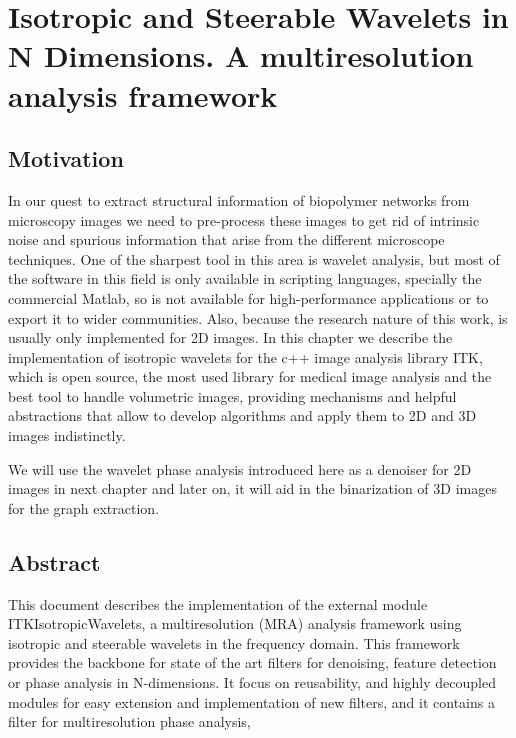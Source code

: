 
\chapter{Isotropic and Steerable Wavelets in N Dimensions. A multiresolution analysis framework}

\label{Chapter-Wavelets} %


\section{Motivation}

In our quest to extract structural information of biopolymer networks from microscopy images
we need to pre-process these images to get rid of intrinsic noise and spurious information
that arise from the different microscope techniques. One of the sharpest tool in this area is wavelet analysis, but most of the software in this field is only available in scripting languages, specially the commercial Matlab, so is not available for high-performance applications
or to export it to wider communities. Also, because the research nature of this work, is usually only implemented for 2D images. In this chapter we describe the implementation of isotropic wavelets for the c++ image analysis library ITK, which is open source, the most used library for medical image analysis and the best tool to handle volumetric images, providing mechanisms and helpful abstractions that allow to develop algorithms and apply them to 2D and 3D images indistinctly.

We will use the wavelet phase analysis introduced here as a denoiser for 2D images in next chapter and later on, it will aid in the binarization of 3D images for the graph extraction.

\section{Abstract}
\noindent
This document describes the implementation of the external module ITKIsotropicWavelets, a multiresolution (MRA) analysis framework using isotropic and steerable wavelets in the frequency domain. This framework provides the backbone for state of the art filters for denoising, feature detection or phase analysis in N-dimensions. It focus on reusability, and highly decoupled modules for easy extension and implementation of new filters, and it contains a filter for multiresolution phase analysis,

